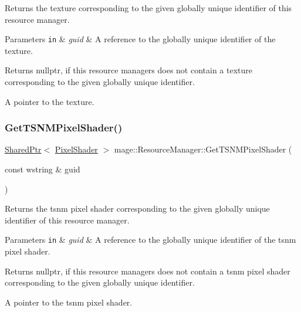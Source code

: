 Returns the texture corresponding to the given globally unique identifier of this resource manager.


\begin{DoxyParams}[1]{Parameters}
\mbox{\tt in}  & {\em guid} & A reference to the globally unique identifier of the texture. \\
\hline
\end{DoxyParams}
\begin{DoxyReturn}{Returns}
{\ttfamily nullptr}, if this resource managers does not contain a texture corresponding to the given globally unique identifier. 

A pointer to the texture. 
\end{DoxyReturn}
\hypertarget{classmage_1_1_resource_manager_a8f90226c6e3f0d5ef0c159ccfc0b46aa}{}\label{classmage_1_1_resource_manager_a8f90226c6e3f0d5ef0c159ccfc0b46aa} 
\subsubsection{\texorpdfstring{Get\+T\+S\+N\+M\+Pixel\+Shader()}{GetTSNMPixelShader()}}
{\footnotesize\ttfamily \hyperlink{namespacemage_a1e01ae66713838a7a67d30e44c67703e}{Shared\+Ptr}$<$ \hyperlink{classmage_1_1_pixel_shader}{Pixel\+Shader} $>$ mage\+::\+Resource\+Manager\+::\+Get\+T\+S\+N\+M\+Pixel\+Shader (\begin{DoxyParamCaption}\item[{const wstring \&}]{guid }\end{DoxyParamCaption})\hspace{0.3cm}{\ttfamily [noexcept]}}

Returns the tsnm pixel shader corresponding to the given globally unique identifier of this resource manager.


\begin{DoxyParams}[1]{Parameters}
\mbox{\tt in}  & {\em guid} & A reference to the globally unique identifier of the tsnm pixel shader. \\
\hline
\end{DoxyParams}
\begin{DoxyReturn}{Returns}
{\ttfamily nullptr}, if this resource managers does not contain a tsnm pixel shader corresponding to the given globally unique identifier. 

A pointer to the tsnm pixel shader. 
\end{DoxyReturn}
\hypertarget{classmage_1_1_resource_manager_a3d0d4eb02b76a865117392d2db6de44d}{}\label{classmage_1_1_resource_manager_a3d0d4eb02b76a865117392d2db6de44d} 
